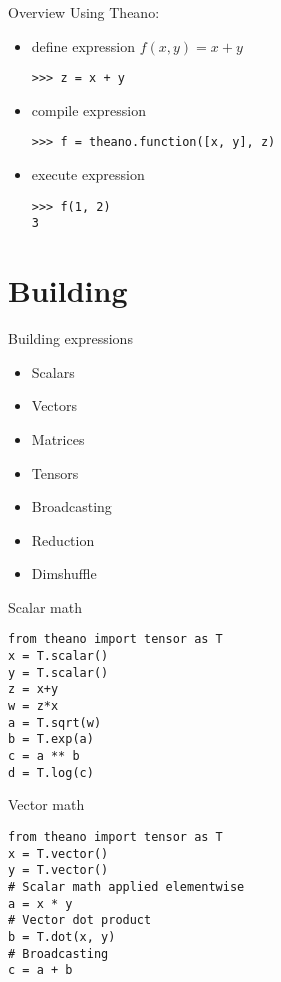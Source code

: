 \documentclass[utf8x,hyperref={pdfpagelabels=false}]{beamer}
\begin{document}
\begin{frame}[fragile]{Overview}
  Using Theano:
  \begin{itemize}
  \item define expression $f(x,y) = x + y$
\begin{lstlisting}
>>> z = x + y
\end{lstlisting}
  \item compile expression
\begin{lstlisting}
>>> f = theano.function([x, y], z)
\end{lstlisting}
  \item execute expression
\begin{lstlisting}
>>> f(1, 2)
3
\end{lstlisting}
  \end{itemize}
\end{frame}

\section{Building}

\begin{frame}{Building expressions}
  \begin{itemize}
  \item Scalars
  \item Vectors
  \item Matrices
  \item Tensors
  \item Broadcasting
  \item Reduction
  \item Dimshuffle
  \end{itemize}
\end{frame}

\begin{frame}[fragile]{Scalar math}
\begin{lstlisting}
from theano import tensor as T
x = T.scalar()
y = T.scalar()
z = x+y
w = z*x
a = T.sqrt(w)
b = T.exp(a)
c = a ** b
d = T.log(c)
\end{lstlisting}
\end{frame}

\begin{frame}[fragile]{Vector math}
\begin{lstlisting}
from theano import tensor as T
x = T.vector()
y = T.vector()
# Scalar math applied elementwise
a = x * y
# Vector dot product
b = T.dot(x, y)
# Broadcasting
c = a + b
\end{lstlisting}
\end{frame}
\end{document}
